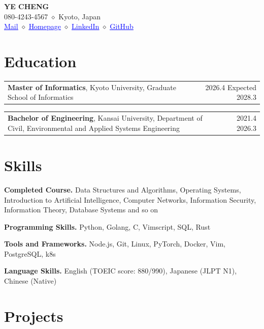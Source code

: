 \documentclass[letterpaper,11pt]{article}
\makeatletter
\newcommand{\resumeHeader}[6]{%
  \begin{center}
    {\LARGE\bfseries #1}\\[0.28em]
    #2\\[0.18em]
    {\small #3 $\diamond$ #4 $\diamond$ #5 $\diamond$ #6}
  \end{center}
  \vspace{0.42em}
}
\newcommand{\educationEntry}[3]{%
  \noindent
  \begin{tabular*}{\textwidth}{@{}p{0.76\textwidth}@{\extracolsep{\fill}}r@{}}
    #1, #2 & #3 \\
  \end{tabular*}
  \vspace{0.68em}
}
\newcommand{\skillLine}[2]{%
  \textbf{#1.} #2\par\vspace{0.32em}
}
\newcommand{\headerLink}[2]{%
  \href{#1}{\textcolor{blue}{\underline{#2}}}%
}
\makeatother
\begin{document}
\resumeHeader{YE CHENG}
  {080-4243-4567 $\diamond$ Kyoto, Japan} %
  {\headerLink{mailto:teiyou416@gmail.com}{Mail}}
  {\headerLink{https://teiyou416.github.io}{Homepage}}
  {\headerLink{https://www.linkedin.com/in/ye-cheng-158360361/}{LinkedIn}}
  {\headerLink{https://github.com/teiyou416}{GitHub}}

\section{Education}

\educationEntry{\textbf{Master of Informatics}}
  {Kyoto University, Graduate School of Informatics}
  {2026.4 \textendash{} Expected 2028.3}

\educationEntry{\textbf{Bachelor of Engineering}}
  {Kansai University, Department of Civil, Environmental and Applied Systems Engineering}
  {2021.4 \textendash{} 2026.3}

\section{Skills}

\skillLine{Completed Course}{Data Structures and Algorithms, Operating Systems, Introduction to Artificial Intelligence, Computer Networks, Information Security, 
Information Theory, Database Systems and so on}

\skillLine{Programming Skills}{Python, Golang, C, Vimscript, SQL, Rust}
\skillLine{Tools and Frameworks}{Node.js, Git, Linux, PyTorch, Docker, Vim, PostgreSQL, k8s}

\skillLine{Language Skills}{English (TOEIC score: 880/990), Japanese (JLPT N1), Chinese (Native)}

\section{Projects}
\end{document}
